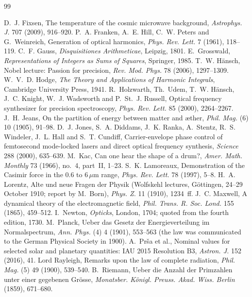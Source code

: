 \documentclass[11pt]{article}
\begin{document}
\begin{thebibliography}{99}
\begin{sloppypar}
 D.~J. Fixsen, The temperature of the cosmic microwave background, \emph{Astrophys. J.} 707 (2009), 916--920.
 P.~A. Franken, A.~E. Hill, C.~W. Peters and G.~Weinreich, Generation of optical harmonics, \emph{Phys. Rev. Lett.} 7 (1961), 118--119.
 C.~F. Gauss, \emph{Disquisitiones Arithmeticae}, Leipzig, 1801.
 E.~Grosswald, \emph{Representations of Integers as Sums of Squares}, Springer, 1985.
 T.~W. H\"ansch, Nobel lecture: Passion for precision, \emph{Rev. Mod. Phys.} 78 (2006), 1297--1309.
 W.~V.~D. Hodge, \emph{The Theory and Applications of Harmonic Integrals}, Cambridge University Press, 1941.
 R.~Holzwarth, Th.~Udem, T.~W. H\"ansch, J.~C. Knight, W.~J. Wadsworth and P.~St.~J. Russell, Optical frequency synthesizer for precision spectroscopy, \emph{Phys. Rev. Lett.} 85 (2000), 2264--2267.
 J.~H. Jeans, On the partition of energy between matter and {\ae}ther, \emph{Phil. Mag.} (6) 10 (1905), 91--98.
 D.~J. Jones, S.~A. Diddams, J.~K. Ranka, A.~Stentz, R.~S. Windeler, J.~L. Hall and S.~T. Cundiff, Carrier-envelope phase control of femtosecond mode-locked lasers and direct optical frequency synthesis, \emph{Science} 288 (2000), 635--639.
 M.~Kac, Can one hear the shape of a drum?, \emph{Amer. Math. Monthly} 73 (1966), no.~4, part~II, 1--23.
 S.~K. Lamoreaux, Demonstration of the Casimir force in the 0.6 to 6\,$\mu$m range, \emph{Phys. Rev. Lett.} 78 (1997), 5--8.
 H.~A. Lorentz, Alte und neue Fragen der Physik (Wolfskehl lectures, G\"ottingen, 24--29 October 1910; report by M.~Born), \emph{Phys. Z.} 11 (1910), 1234~ff.
 J.~C. Maxwell, A dynamical theory of the electromagnetic field, \emph{Phil. Trans. R. Soc. Lond.} 155 (1865), 459--512.
 I.~Newton, \emph{Opticks}, London, 1704; quoted from the fourth edition, 1730.
 M.~Planck, Ueber das Gesetz der Energieverteilung im Normalspectrum, \emph{Ann. Phys.} (4) 4 (1901), 553--563 (the law was communicated to the German Physical Society in 1900).
 A.~Pr\v{s}a et al., Nominal values for selected solar and planetary quantities: IAU 2015 Resolution B3, \emph{Astron. J.} 152 (2016), 41.
 Lord Rayleigh, Remarks upon the law of complete radiation, \emph{Phil. Mag.} (5) 49 (1900), 539--540.
 B.~Riemann, Ueber die Anzahl der Primzahlen unter einer gegebenen Gr\"osse, \emph{Monatsber. K\"onigl. Preuss. Akad. Wiss. Berlin} (1859), 671--680.

\end{sloppypar}
\end{thebibliography}
\end{document}
